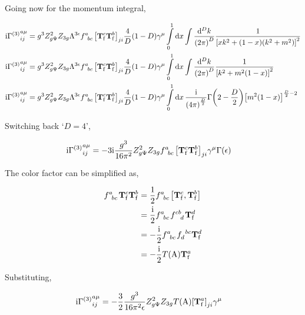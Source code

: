 Going now for the momentum integral,

\begin{align}
    \im{\Gamma^{\qty(3)}}^{a\mu}_{ij}&=g^3Z_{g\Psi}^2Z_{3g}\Lambda^{3\epsilon}
    \tensor{f}{^a_b_c}\qty[\vb T^c_{\textnormal f}\vb T^b_{\textnormal f}]_{ji}\frac4D\qty(1-D)\gamma^\mu
    \int\limits_0^1\dd{x}\int\frac{\dd[D]{k}}{\qty(2\pi)^D}\frac{1}{\qty[xk^2+\qty(1-x)\qty(k^2+m^2)]^2}\nonumber\\
    \im{\Gamma^{\qty(3)}}^{a\mu}_{ij}&=g^3Z_{g\Psi}^2Z_{3g}\Lambda^{3\epsilon}
    \tensor{f}{^a_b_c}\qty[\vb T^c_{\textnormal f}\vb T^b_{\textnormal f}]_{ji}\frac4D\qty(1-D)\gamma^\mu
    \int\limits_0^1\dd{x}\int\frac{\dd[D]{k}}{\qty(2\pi)^D}\frac{1}{\qty[k^2+m^2\qty(1-x)]^2}\nonumber\\
    \im{\Gamma^{\qty(3)}}^{a\mu}_{ij}&=g^3Z_{g\Psi}^2Z_{3g}\Lambda^{3\epsilon}
    \tensor{f}{^a_b_c}\qty[\vb T^c_{\textnormal f}\vb T^b_{\textnormal f}]_{ji}\frac4D\qty(1-D)\gamma^\mu
    \int\limits_0^1\dd{x}\frac{\im}{\qty(4\pi)^{\frac D2}}\Gamma\qty(2-\frac D2)\qty[m^2\qty(1-x)]^{\frac D2-2}\nonumber
\end{align}

Switching back `$D=4$',

\begin{align}
    \im{\Gamma^{\qty(3)}}^{a\mu}_{ij}&=-3\im\frac{g^3}{16\pi^2}Z_{g\Psi}^2Z_{3g}
    \tensor{f}{^a_b_c}\qty[\vb T^c_{\textnormal f}\vb T^b_{\textnormal f}]_{ji}\gamma^\mu
    \Gamma\qty(\epsilon)\nonumber
\end{align}

The color factor can be simplified as,

\begin{align}
    \tensor{f}{^a_b_c}\vb T^c_{\textnormal f}\vb T^b_{\textnormal f}&=\frac12\tensor{f}{^a_b_c}\comm{\vb T^c_{\textnormal f}}{\vb T^b_{\textnormal f}}\nonumber\\
    &=\frac\im2\tensor{f}{^a_b_c}\tensor{f}{^c^b_d}\vb T^d_{\textnormal f}\nonumber\\
    &=-\frac\im2\tensor{f}{^a_b_c}\tensor{f}{_d^b^c}\vb T^d_{\textnormal f}\nonumber\\
    &=-\frac\im2T\qty(\textnormal A)\vb T^a_{\textnormal f}\nonumber
\end{align}

Substituting,

\begin{align}
    \textnormal{i}{\Gamma^{\qty(3)}}^{a\mu}_{ij}&=-\frac32\frac{g^3}{16\pi^2\epsilon}Z_{g\Psi}^2Z_{3g}
    T\qty(\textnormal A)\qty[\vb T^a_{\textnormal f}]_{ji}\gamma^\mu\nonumber
\end{align}

